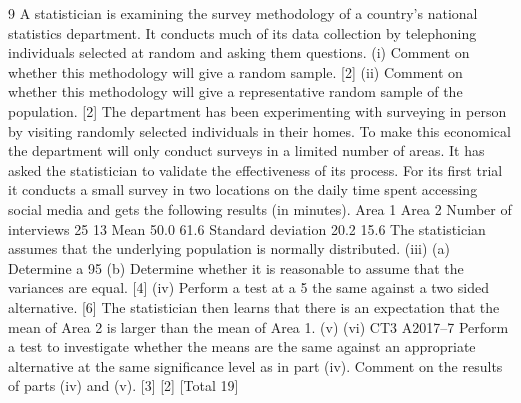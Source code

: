 \documentclass[a4paper,12pt]{article}
\begin{document}
\begin{enumerate}
[Total 20]
9
A statistician is examining the survey methodology of a country’s national statistics
department. It conducts much of its data collection by telephoning individuals
selected at random and asking them questions.
(i) Comment on whether this methodology will give a random sample.
[2]
(ii) Comment on whether this methodology will give a representative random
sample of the population.
[2]
The department has been experimenting with surveying in person by visiting
randomly selected individuals in their homes. To make this economical the
department will only conduct surveys in a limited number of areas. It has asked the
statistician to validate the effectiveness of its process.
For its first trial it conducts a small survey in two locations on the daily time spent
accessing social media and gets the following results (in minutes).
Area 1
Area 2
Number of
interviews
25
13
Mean
50.0
61.6
Standard
deviation
20.2
15.6
The statistician assumes that the underlying population is normally distributed.
(iii)
(a) Determine a 95%
(b) Determine whether it is reasonable to assume that the variances are
equal.
[4]
(iv)
Perform a test at a 5%
the same against a two sided alternative.
[6]
The statistician then learns that there is an expectation that the mean of Area 2 is
larger than the mean of Area 1.
(v)
(vi)
CT3 A2017–7
Perform a test to investigate whether the means are the same against an
appropriate alternative at the same significance level as in part (iv).
Comment on the results of parts (iv) and (v).
[3]
[2]
[Total 19]


\end{enumerate}
\end{document}
